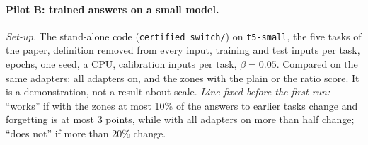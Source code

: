 \paragraph{Pilot B: trained answers on a small model.} \emph{Set-up.} The stand-alone code (\texttt{certified\_switch/}) on \texttt{t5-small}, the five tasks of the paper, definition removed from every input, \BoundBTrain{} training and \BoundBTest{} test inputs per task, \BoundBEpochs{} epochs, one seed, a CPU, \BoundBCal{} calibration inputs per task, $\beta = 0.05$. Compared on the same adapters: all adapters on, and the zones with the plain or the ratio score. It is a demonstration, not a result about scale.
\emph{Line fixed before the first run:} ``works'' if with the zones at most 10\% of the \BoundBCompared{} answers to earlier tasks change and forgetting is at most 3 points, while with all adapters on more than half change; ``does not'' if more than 20\% change.

\begin{table}[t]
  \caption{Pilot B, \texttt{t5-small}, five tasks, no definition in any input, one seed. Rouge-L averages over the tasks: ``Learned'' right after each task was learned, ``End'' at the end; forgetting is the average over the first four tasks of the drop from learned to end, so it is not the difference of the two columns. ``Changed'': of the \BoundBCompared{} answers to test inputs of the first four tasks, those that differ at the end. ``Own task'': test inputs given to their own task after the last task. Last column: per task in order, test inputs inside the zone of an older task when the task arrives.}
  \label{tab:boundpilotb}
  \centering
  \footnotesize
  \setlength{\tabcolsep}{3pt}
  
\end{table}

